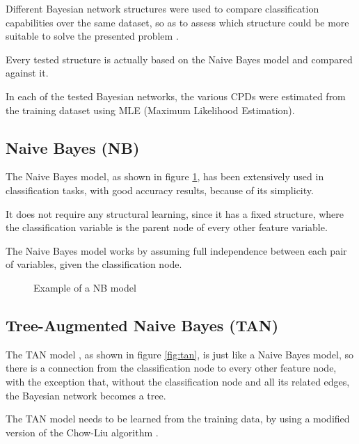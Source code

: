 \documentclass[twoside,twocolumn]{article}
\begin{document}
Different Bayesian network structures were used to compare classification capabilities over the same dataset, so as to assess which structure could be more suitable to solve the presented problem \cite{bib:chengc}.

Every tested structure is actually based on the Naive Bayes model and compared against it.

In each of the tested Bayesian networks, the various CPDs were estimated from the training dataset using MLE (Maximum Likelihood Estimation).

\subsection{Naive Bayes (NB)}

The Naive Bayes model, as shown in figure \ref{fig:nb}, has been extensively used in classification tasks, with good accuracy results, because of its simplicity. 

It does not require any structural learning, since it has a fixed structure, where the classification variable is the parent node of every other feature variable.

The Naive Bayes model works by assuming full independence between each pair of variables, given the classification node.

\begin{figure}[h]
  \caption{Example of a NB model}
  \centering
  \label{fig:nb}
\end{figure}

\subsection{Tree-Augmented Naive Bayes (TAN)}

The TAN model \cite{bib:friedman}, as shown in figure \ref{fig:tan}, is just like a Naive Bayes model, so there is a connection from the classification node to every other feature node, 
with the exception that, without the classification node and all its related edges, the Bayesian network becomes a tree.

The TAN model needs to be learned from the training data, by using a modified version of the Chow-Liu algorithm \cite{bib:cl}.
\end{document}
